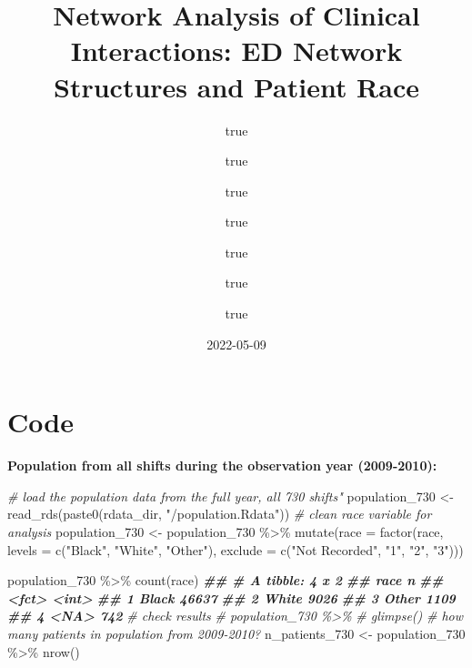 \documentclass[
]{article}
\title{Network Analysis of Clinical Interactions: ED Network Structures
and Patient Race}
\author{true \and true \and true \and true \and true \and true \and true}
\date{2022-05-09}
\newenvironment{Shaded}{\begin{snugshade}}{\end{snugshade}}
\newcommand{\AttributeTok}[1]{\textcolor[rgb]{0.77,0.63,0.00}{#1}}
\newcommand{\CommentTok}[1]{\textcolor[rgb]{0.56,0.35,0.01}{\textit{#1}}}
\newcommand{\DocumentationTok}[1]{\textcolor[rgb]{0.56,0.35,0.01}{\textbf{\textit{#1}}}}
\newcommand{\FunctionTok}[1]{\textcolor[rgb]{0.00,0.00,0.00}{#1}}
\newcommand{\NormalTok}[1]{#1}
\newcommand{\OtherTok}[1]{\textcolor[rgb]{0.56,0.35,0.01}{#1}}
\newcommand{\SpecialCharTok}[1]{\textcolor[rgb]{0.00,0.00,0.00}{#1}}
\newcommand{\StringTok}[1]{\textcolor[rgb]{0.31,0.60,0.02}{#1}}
\begin{document}
\maketitle

\hypertarget{code}{%
\section{Code}\label{code}}

\textbf{Population from all shifts during the observation year
(2009-2010):}

\begin{Shaded}
\begin{Highlighting}[]
\CommentTok{\# load the population data from the full year, all 730 shifts"}
\NormalTok{population\_730 }\OtherTok{\textless{}{-}} \FunctionTok{read\_rds}\NormalTok{(}\FunctionTok{paste0}\NormalTok{(rdata\_dir, }\StringTok{"/population.Rdata"}\NormalTok{))}
\CommentTok{\# clean race variable for analysis}
\NormalTok{population\_730 }\OtherTok{\textless{}{-}}\NormalTok{ population\_730 }\SpecialCharTok{\%\textgreater{}\%}
  \FunctionTok{mutate}\NormalTok{(}\AttributeTok{race =} \FunctionTok{factor}\NormalTok{(race,}
              \AttributeTok{levels =} \FunctionTok{c}\NormalTok{(}\StringTok{"Black"}\NormalTok{,}
                         \StringTok{"White"}\NormalTok{,}
                         \StringTok{"Other"}\NormalTok{),}
              \AttributeTok{exclude =} \FunctionTok{c}\NormalTok{(}\StringTok{"Not Recorded"}\NormalTok{, }\StringTok{"1"}\NormalTok{, }\StringTok{"2"}\NormalTok{, }\StringTok{"3"}\NormalTok{)))}

\NormalTok{population\_730 }\SpecialCharTok{\%\textgreater{}\%} 
    \FunctionTok{count}\NormalTok{(race)}
\DocumentationTok{\#\# \# A tibble: 4 x 2}
\DocumentationTok{\#\#   race      n}
\DocumentationTok{\#\#   \textless{}fct\textgreater{} \textless{}int\textgreater{}}
\DocumentationTok{\#\# 1 Black 46637}
\DocumentationTok{\#\# 2 White  9026}
\DocumentationTok{\#\# 3 Other  1109}
\DocumentationTok{\#\# 4 \textless{}NA\textgreater{}    742}
\CommentTok{\# check results}
\CommentTok{\# population\_730 \%\textgreater{}\% }
  \CommentTok{\# glimpse()}
\CommentTok{\# how many patients in population from 2009{-}2010?}
\NormalTok{n\_patients\_730 }\OtherTok{\textless{}{-}}\NormalTok{ population\_730 }\SpecialCharTok{\%\textgreater{}\%}
  \FunctionTok{nrow}\NormalTok{()}
\end{Highlighting}
\end{Shaded}
\end{document}
